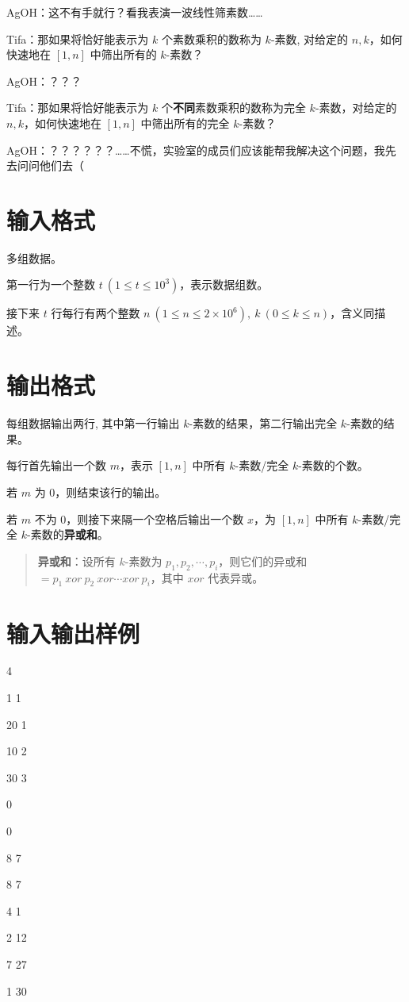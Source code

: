 \documentclass{../cpct/ctpro}
\begin{document}
AgOH：这不有手就行？看我表演一波线性筛素数……

Tifa：那如果将恰好能表示为 $k$ 个素数乘积的数称为 $k$-素数, 对给定的 $n,k$，如何快速地在 $[1,n]$ 中筛出所有的 $k$-素数？

AgOH：？？？

Tifa：那如果将恰好能表示为 $k$ 个\textbf{不同}素数乘积的数称为完全 $k$-素数，对给定的 $n,k$，如何快速地在 $[1,n]$ 中筛出所有的完全 $k$-素数？

AgOH：？？？？？？……不慌，实验室的成员们应该能帮我解决这个问题，我先去问问他们去（

\section*{输入格式}

多组数据。

第一行为一个整数 $t~(1\leq t\leq 10^3)$，表示数据组数。

接下来 $t$ 行每行有两个整数 $n~(1 \leq n \leq 2 \times {10}^6),~k~(0 \leq k \leq n)$，含义同描述。

\section*{输出格式}

每组数据输出两行, 其中第一行输出 $k$-素数的结果，第二行输出完全 $k$-素数的结果。

每行首先输出一个数 $m$，表示 $[1,n]$ 中所有 $k$-素数/完全 $k$-素数的个数。

若 $m$ 为 $0$，则结束该行的输出。

若 $m$ 不为 $0$，则接下来隔一个空格后输出一个数 $x$，为 $[1,n]$ 中所有 $k$-素数/完全 $k$-素数的\textbf{异或和}。

\begin{quote}
    \textbf{异或和}：设所有 $k$-素数为 $p_1,p_2,\cdots,p_i$，则它们的异或和 $=p_1 \ xor \ p_2 \ xor \cdots xor \ p_i$，其中 $xor$ 代表异或。
\end{quote}

\section*{输入输出样例}

\testcasetab
{
    4\par
    1 1\par
    20 1\par
    10 2\par
    30 3
}
{
    0\par
    0\par
    8 7\par
    8 7\par
    4 1\par
    2 12\par
    7 27\par
    1 30
}
\end{document}
